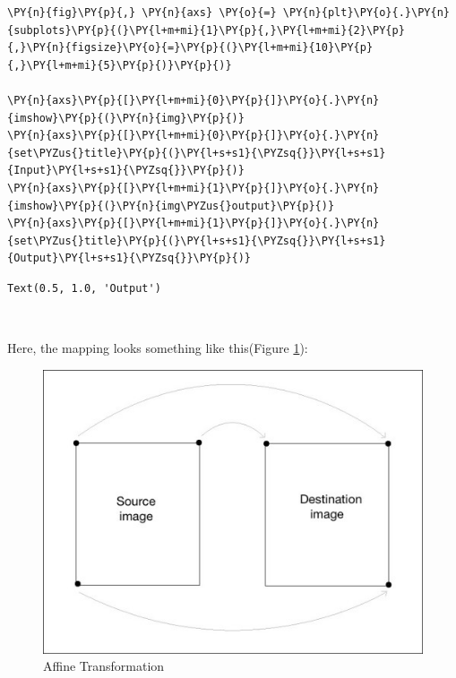 \begin{tcolorbox}[breakable, size=fbox, boxrule=1pt, pad at break*=1mm,colback=cellbackground, colframe=cellborder]
	\begin{Verbatim}[commandchars=\\\{\}]
\PY{n}{fig}\PY{p}{,} \PY{n}{axs} \PY{o}{=} \PY{n}{plt}\PY{o}{.}\PY{n}{subplots}\PY{p}{(}\PY{l+m+mi}{1}\PY{p}{,}\PY{l+m+mi}{2}\PY{p}{,}\PY{n}{figsize}\PY{o}{=}\PY{p}{(}\PY{l+m+mi}{10}\PY{p}{,}\PY{l+m+mi}{5}\PY{p}{)}\PY{p}{)}

\PY{n}{axs}\PY{p}{[}\PY{l+m+mi}{0}\PY{p}{]}\PY{o}{.}\PY{n}{imshow}\PY{p}{(}\PY{n}{img}\PY{p}{)}
\PY{n}{axs}\PY{p}{[}\PY{l+m+mi}{0}\PY{p}{]}\PY{o}{.}\PY{n}{set\PYZus{}title}\PY{p}{(}\PY{l+s+s1}{\PYZsq{}}\PY{l+s+s1}{Input}\PY{l+s+s1}{\PYZsq{}}\PY{p}{)}
\PY{n}{axs}\PY{p}{[}\PY{l+m+mi}{1}\PY{p}{]}\PY{o}{.}\PY{n}{imshow}\PY{p}{(}\PY{n}{img\PYZus{}output}\PY{p}{)}
\PY{n}{axs}\PY{p}{[}\PY{l+m+mi}{1}\PY{p}{]}\PY{o}{.}\PY{n}{set\PYZus{}title}\PY{p}{(}\PY{l+s+s1}{\PYZsq{}}\PY{l+s+s1}{Output}\PY{l+s+s1}{\PYZsq{}}\PY{p}{)}
	\end{Verbatim}
\end{tcolorbox}

\begin{tcolorbox}[breakable, size=fbox, boxrule=.5pt, pad at break*=1mm, opacityfill=0]
	\begin{Verbatim}[commandchars=\\\{\}]
Text(0.5, 1.0, 'Output')
	\end{Verbatim}
\end{tcolorbox}

\begin{center}
\end{center}
{ \hspace*{\fill} \\}

Here, the mapping looks something like this(Figure \ref{fig26}):

\begin{figure}[H]
	\centering \includegraphics[width=0.6\columnwidth]{figures/Fig26.jpg}
	\caption{Affine Transformation}
	\label{fig26}
\end{figure}

